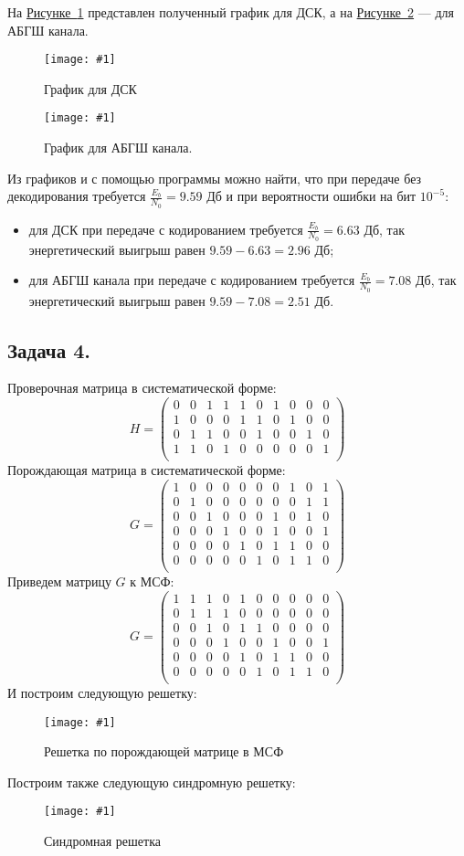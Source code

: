 \documentclass{article}
\newcommand{\inlref}[2]{\hyperref[#2]{#1~\ref*{#2}}}
\newcommand{\image}[3]{%
    \begin{figure}[H]
        \centering
        \texttt{[image: \#1]}
        \caption{#2}
        \label{img:#1}
    \end{figure}
}
\begin{document}
На \inlref{Рисунке}{img:bsc_ml_100000.png} представлен полученный график для ДСК, а на \inlref{Рисунке}{img:awgn_ml_100000.png} {---} для АБГШ канала.
%
\image {bsc_ml_100000.png} {График для ДСК} {\textwidth}
%
%
\image {awgn_ml_100000.png} {График для АБГШ канала.} {\textwidth}
%
Из графиков и с помощью программы можно найти, что при передаче без декодирования требуется $\frac{E_{b}}{N_{0}}=9.59$ Дб и при вероятности ошибки на бит $10^{-5}$:
\begin{itemize}
    \item для ДСК при передаче с кодированием требуется $\frac{E_{b}}{N_{0}} = 6.63$ Дб, так энергетический выигрыш равен $9.59 - 6.63 = 2.96$ Дб;
    \item для АБГШ канала при передаче с кодированием требуется $\frac{E_{b}}{N_{0}} = 7.08$ Дб, так энергетический выигрыш равен $9.59 - 7.08 = 2.51$ Дб.
\end{itemize}
%
\subsection{Задача 4.}
%
Проверочная матрица в систематической форме:
$$H=
\begin{pmatrix}
0 &	0 & 1 & 1 & 1 & 0 & 1 & 0 & 0 & 0 \\	
1 & 0 & 0 & 0 & 1 & 1 & 0 & 1 & 0 & 0 \\
0 & 1 & 1 & 0 & 0 & 1 & 0 & 0 & 1 & 0 \\
1 & 1 & 0 & 1 & 0 & 0 & 0 & 0 & 0 & 1 \\
\end{pmatrix}$$ 
Порождающая матрица в систематической форме:
$$G=
\begin{pmatrix}
1 &	0 &	0 &	0 &	0 &	0 &	0 &	1 &	0 &	1 \\
0 &	1 &	0 &	0 &	0 &	0 &	0 &	0 &	1 &	1 \\	
0 &	0 &	1 &	0 &	0 &	0 &	1 &	0 &	1 &	0 \\	
0 &	0 &	0 &	1 &	0 &	0 &	1 &	0 &	0 &	1 \\	
0 &	0 &	0 &	0 &	1 &	0 &	1 &	1 &	0 &	0 \\	
0 &	0 &	0 &	0 &	0 &	1 &	0 &	1 &	1 &	0 \\
\end{pmatrix}$$
Приведем матрицу $G$ к МСФ:
$$G=
\begin{pmatrix}
1 & 1 & 1 & 0 & 1 & 0 & 0 & 0 & 0 & 0 \\
0 & 1 & 1 & 1 & 0 & 0 & 0 & 0 & 0 & 0 \\
0 & 0 & 1 & 0 & 1 & 1 & 0 & 0 & 0 & 0 \\
0 & 0 & 0 & 1 & 0 & 0 & 1 & 0 & 0 & 1 \\
0 & 0 & 0 & 0 & 1 & 0 & 1 & 1 & 0 & 0 \\
0 & 0 & 0 & 0 & 0 & 1 & 0 & 1 & 1 & 0 \\
\end{pmatrix}$$
И построим следующую решетку:
%
\image {G_graph.eps} {Решетка по порождающей матрице в МСФ} {\textwidth}
%
Построим также следующую синдромную решетку:
%
\image {sindrom.eps} {Синдромная решетка} {\textwidth}
%
%
\end{document}
